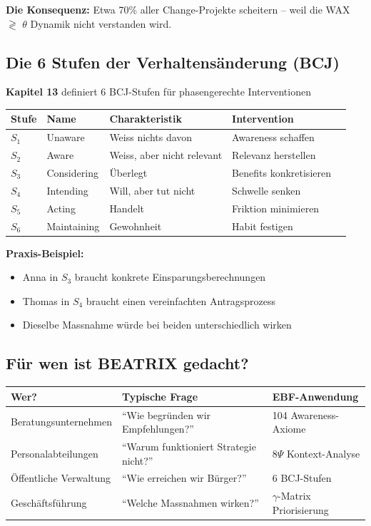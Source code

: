 \documentclass[11pt,a4paper]{article}
\begin{document}
\textbf{Die Konsequenz:} Etwa 70\% aller Change-Projekte scheitern -- weil die WAX $\gtrless$ $\theta$ Dynamik nicht verstanden wird.

\subsection{Die 6 Stufen der Verhaltensänderung (BCJ)}

\begin{ebfbox}
\textbf{Kapitel 13} definiert 6 BCJ-Stufen für phasengerechte Interventionen
\end{ebfbox}

\begin{center}
\begin{tabular}{lllll}
\toprule
\textbf{Stufe} & \textbf{Name} & \textbf{Charakteristik} & \textbf{Intervention} \\
\midrule
$S_1$ & Unaware & Weiss nichts davon & Awareness schaffen \\
$S_2$ & Aware & Weiss, aber nicht relevant & Relevanz herstellen \\
$S_3$ & Considering & Überlegt & Benefits konkretisieren \\
$S_4$ & Intending & Will, aber tut nicht & Schwelle senken \\
$S_5$ & Acting & Handelt & Friktion minimieren \\
$S_6$ & Maintaining & Gewohnheit & Habit festigen \\
\bottomrule
\end{tabular}
\end{center}

\textbf{Praxis-Beispiel:}
\begin{itemize}[nosep]
    \item Anna in $S_3$ braucht konkrete Einsparungsberechnungen
    \item Thomas in $S_4$ braucht einen vereinfachten Antragsprozess
    \item Dieselbe Massnahme würde bei beiden unterschiedlich wirken
\end{itemize}

\subsection{Für wen ist BEATRIX gedacht?}

\begin{center}
\begin{tabular}{lll}
\toprule
\textbf{Wer?} & \textbf{Typische Frage} & \textbf{EBF-Anwendung} \\
\midrule
Beratungsunternehmen & ``Wie begründen wir Empfehlungen?'' & 104 Awareness-Axiome \\
Personalabteilungen & ``Warum funktioniert Strategie nicht?'' & 8$\Psi$ Kontext-Analyse \\
Öffentliche Verwaltung & ``Wie erreichen wir Bürger?'' & 6 BCJ-Stufen \\
Geschäftsführung & ``Welche Massnahmen wirken?'' & $\gamma$-Matrix Priorisierung \\
\bottomrule
\end{tabular}
\end{center}
\end{document}
